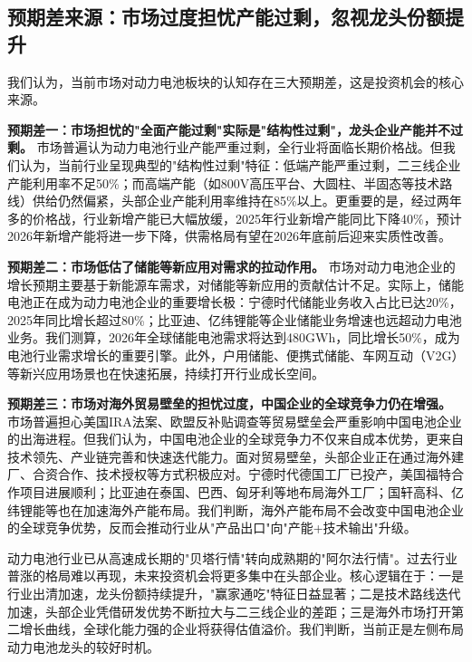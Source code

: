 \subsection{预期差来源：市场过度担忧产能过剩，忽视龙头份额提升}

我们认为，当前市场对动力电池板块的认知存在三大预期差，这是投资机会的核心来源。

\textbf{预期差一：市场担忧的"全面产能过剩"实际是"结构性过剩"，龙头企业产能并不过剩。} 市场普遍认为动力电池行业产能严重过剩，全行业将面临长期价格战。但我们认为，当前行业呈现典型的"结构性过剩"特征：低端产能严重过剩，二三线企业产能利用率不足50\%；而高端产能（如800V高压平台、大圆柱、半固态等技术路线）供给仍然偏紧，头部企业产能利用率维持在85\%以上。更重要的是，经过两年多的价格战，行业新增产能已大幅放缓，2025年行业新增产能同比下降40\%，预计2026年新增产能将进一步下降，供需格局有望在2026年底前后迎来实质性改善。

\textbf{预期差二：市场低估了储能等新应用对需求的拉动作用。} 市场对动力电池企业的增长预期主要基于新能源车需求，对储能等新应用的贡献估计不足。实际上，储能电池正在成为动力电池企业的重要增长极：宁德时代储能业务收入占比已达20\%，2025年同比增长超过80\%；比亚迪、亿纬锂能等企业储能业务增速也远超动力电池业务。我们测算，2026年全球储能电池需求将达到480GWh，同比增长50\%，成为电池行业需求增长的重要引擎。此外，户用储能、便携式储能、车网互动（V2G）等新兴应用场景也在快速拓展，持续打开行业成长空间。

\textbf{预期差三：市场对海外贸易壁垒的担忧过度，中国企业的全球竞争力仍在增强。} 市场普遍担心美国IRA法案、欧盟反补贴调查等贸易壁垒会严重影响中国电池企业的出海进程。但我们认为，中国电池企业的全球竞争力不仅来自成本优势，更来自技术领先、产业链完善和快速迭代能力。面对贸易壁垒，头部企业正在通过海外建厂、合资合作、技术授权等方式积极应对。宁德时代德国工厂已投产，美国福特合作项目进展顺利；比亚迪在泰国、巴西、匈牙利等地布局海外工厂；国轩高科、亿纬锂能等也在加速海外产能布局。我们判断，海外产能布局不会改变中国电池企业的全球竞争优势，反而会推动行业从"产品出口"向"产能+技术输出"升级。

\begin{keyinsight}
动力电池行业已从高速成长期的"贝塔行情"转向成熟期的"阿尔法行情"。过去行业普涨的格局难以再现，未来投资机会将更多集中在头部企业。核心逻辑在于：一是行业出清加速，龙头份额持续提升，"赢家通吃"特征日益显著；二是技术路线迭代加速，头部企业凭借研发优势不断拉大与二三线企业的差距；三是海外市场打开第二增长曲线，全球化能力强的企业将获得估值溢价。我们判断，当前正是左侧布局动力电池龙头的较好时机。
\end{keyinsight}

